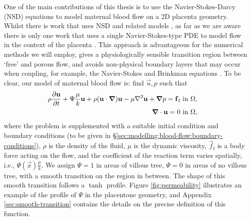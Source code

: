         One of the main contributions of this thesis is to use the Navier-Stokes-Darcy (NSD) equations to model maternal blood flow on a 2D placenta geometry. Whilst there is work that uses NSD and related models \cite{angotPenalizationMethodTake1999,fuchsbergerIncorporationObstaclesFluid2022,engelsFluSINovelParallel2016,jiaModelingAnalysisCarbonate2021}, as far as we are aware there is only one work that uses a single Navier-Stokes-type PDE to model flow in the context of the placenta \cite{meklerImpactTissuePorosity2022}. This approach is advantageous for the numerical methods we will employ, gives a physiologically sensible transition region between `free' and porous flow, and avoids non-physical boundary layers that may occur when coupling, for example, the Navier-Stokes and Brinkman equations \cite{brinkmanCalculationViscousForce1949}. To be clear, our model of maternal blood flow is: find $\vec{u}, p$ such that
        \begin{subequations}
            \begin{align}
                \begin{split}
                    \rho \pdv{\vec{u}}{t} + \Psi \frac{\mu}{k} \vec{u} + \rho (\vec{u} \cdot \vec{\nabla}) \vec{u} - \mu \nabla^2 \vec{u} + \vec{\nabla} p = \vec{f}_\text{f} &~ \text{in } \Omega,
                    \label{eq:nsb:momentum}
                \end{split}\\
                \begin{split}
                    \vec{\nabla} \cdot \vec{u} = 0 &~ \text{in } \Omega,
                    \label{eq:nsb:incompressibility}%
                \end{split}%
            \end{align}%
            \label{eq:nsb}%
        \end{subequations}%
        where the problem is supplemented with a suitable initial condition and boundary conditions (to be given in \S\ref{sec:modelling:blood-flow:boundary-conditions}), $\rho$ is the density of the fluid, $\mu$ is the dynamic viscosity, $\vec{f}_\text{f}$ is a body force acting on the flow, and the coefficient of the reaction term varies spatially, i.e., $\Psi(\vec{x}) \frac{\mu}{k}$. We assign $\Psi = 1$ in areas of villous tree, $\Psi = 0$ in areas of no villous tree, with a smooth transition on the region in between. The shape of this smooth transition follows a $\tanh$ profile. Figure \ref{fig:permeability} illustrates an example of the profile of $\Psi$ in the placentone geometry, and Appendix \ref{sec:smooth-transition} contains the details on the precise definition of this function.

